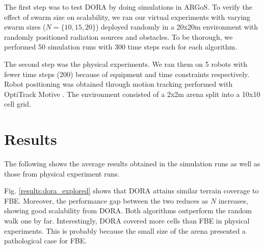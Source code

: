 The first step was to test \ac{DORA} by doing simulations in ARGoS. To verify the effect of swarm size on scalability, we ran our virtual experiments with varying swarm sizes ($N =\{10, 15, 20\}$) deployed randomly in a 20x20m environment with randomly positioned radiation sources and obstacles. To be thorough, we performed 50 simulation runs with 300 time steps each for each algorithm. 

The second step was the physical experiments. We ran them on 5 robots with fewer time steps (200) because of equipment and time constraints respectively. Robot positioning was obtained through motion tracking performed with OptiTrack Motive \cite{optitrack2021motive}. The environment consisted of a 2x2m arena split into a 10x10 cell grid.

\FloatBarrier

\section{Results}
The following shows the average results obtained in the simulation runs as well as those from physical experiment runs.

Fig. \ref{results:dora_explored} shows that \ac{DORA} attains similar terrain coverage to \ac{FBE}. Moreover, the performance gap between the two reduces as $N$ increases, showing good scalability from \ac{DORA}. Both algorithms outperform the random walk one by far. Interestingly, \ac{DORA} covered more cells than \ac{FBE} in physical experiments. This is probably because the small size of the arena presented a pathological case for \ac{FBE}. 

